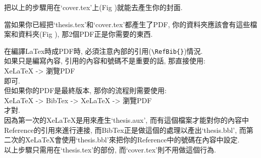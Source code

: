 
\newpage
把以上的步驟用在`cover.tex'上(Fig )就能去產生你的封面.


當如果你已經把`thesis.tex'和`cover.tex'都產生了PDF, 你的資料夾應該會有這些檔案和資料夾(Fig ), 那2個PDF正是你需要的東西.



\newpage
{}

在編譯LaTex時成PDF時, 必須注意內部的引用(\verb|\RefBib{}|)情況.\\

如果只是編寫內容, 引用的內容和號碼不是重要的話, 那直接使用:\\
XeLaTeX -> 瀏覽PDF\\
即可.\\

但如果你的PDF是最終版本, 那你的流程則需要使用:\\
XeLaTeX -> BibTex -> XeLaTeX -> 瀏覽PDF\\
才對.\\

因為第一次的XeLaTeX是用來產生`thesis.aux', 而有這個檔案才能對你的內容中Reference的引用來進行連接, 而BibTex正是做這個的處理以產出`thesis.bbl', 而第二次的XeLaTeX會使用`thesis.bbl'來把你的Reference中的號碼在內容中設定.\\

以上步驟只需用在`thesis.tex'的部份, 而`cover.tex'則不用做這個行為.

